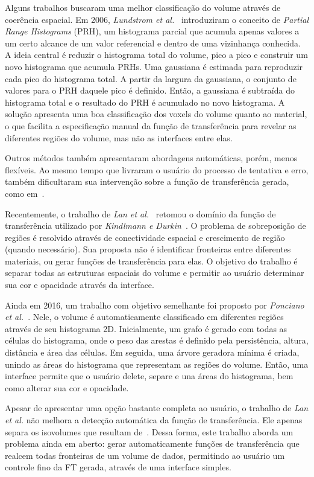 	Alguns trabalhos buscaram uma melhor classificação do volume através de coerência espacial. Em 2006, \textit{Lundstrom et al.}~\cite{lundstrom1} introduziram o conceito de \textit{Partial Range Histograms} (PRH), um histograma parcial que acumula apenas valores a um certo alcance de um valor referencial e dentro de uma vizinhança conhecida. A ideia central é reduzir o histograma total do volume, pico a pico e construir um novo histograma que acumula PRHs. Uma gaussiana é estimada para reproduzir cada pico do histograma total. A partir da largura da gaussiana, o conjunto de valores para o PRH daquele pico é definido. Então, a gaussiana é subtraída do histograma total e o resultado do PRH é acumulado no novo histograma. A solução apresenta uma boa classificação dos voxels do volume quanto ao material, o que facilita a especificação manual da função de transferência para revelar as diferentes regiões do volume, mas não as interfaces entre elas.
	
	Outros métodos também apresentaram abordagens automáticas, porém, menos flexíveis. Ao mesmo tempo que livraram o usuário do processo de tentativa e erro, também dificultaram sua intervenção sobre a função de transferência gerada, como em~\cite{ruiz, zhou}.
	
	Recentemente, o trabalho de \textit{Lan et al.}~\cite{lan} retomou o domínio da função de transferência utilizado por \textit{Kindlmann e Durkin}~\cite{gordon}. O problema de sobreposição de regiões é resolvido através de conectividade espacial e crescimento de região (quando necessário). Sua proposta não é identificar fronteiras entre diferentes materiais, ou gerar funções de transferência para elas. O objetivo do trabalho é separar todas as estruturas espaciais do volume e permitir ao usuário determinar sua cor e opacidade através da interface.
	
	Ainda em 2016, um trabalho com objetivo semelhante foi proposto por \textit{Ponciano et al.}~\cite{marroquim}. Nele, o volume é automaticamente classificado em diferentes regiões através de seu histograma 2D. Inicialmente, um grafo é gerado com todas as células do histograma, onde o peso das arestas é definido pela persistência, altura, distância e área das células. Em seguida, uma árvore geradora mínima é criada, unindo as áreas do histograma que representam as regiões do volume. Então, uma interface permite que o usuário delete, separe e una áreas do histograma, bem como alterar sua cor e opacidade.
	
	Apesar de apresentar uma opção bastante completa ao usuário, o trabalho de \textit{Lan et al.} não melhora a detecção automática da função de transferência. Ele apenas separa os isovolumes que resultam de~\cite{gordon, kniss1, kniss2}. Dessa forma, este trabalho aborda um problema ainda em aberto: gerar automaticamente funções de transferência que realcem todas fronteiras de um volume de dados, permitindo ao usuário um controle fino da FT gerada, através de uma interface simples.